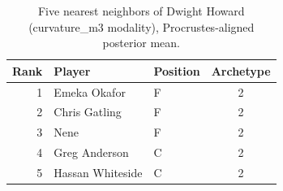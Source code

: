 \begin{table}[htbp]
  \centering\small
  \begin{tabular}{rllc}
    \toprule
    Rank & Player & Position & Archetype \\
    \midrule
    1 & Emeka Okafor & F & 2 \\
    2 & Chris Gatling & F & 2 \\
    3 & Nene & F & 2 \\
    4 & Greg Anderson & C & 2 \\
    5 & Hassan Whiteside & C & 2 \\
    \bottomrule
  \end{tabular}
  \caption{Five nearest neighbors of Dwight Howard (curvature_m3 modality), Procrustes-aligned posterior mean.}
  \label{tab:Dwight_Howard_neighbors_curvature_m3}
\end{table}

